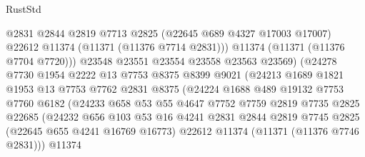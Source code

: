 \begin{lexlean}{RustStd}
\begin{coremodule}
                              @2831
                              @2844
                              @2819
                              @7713
                              @2825
                              (@22645 @689 @4327 @17003 @17007)
                              @22612
                              @11374
                              (@11371 (@11376 @7714 @2831)))
                            @11374
                            (@11371 (@11376 @7704 @7720)))
                          @23548
                          @23551
                          @23554
                          @23558
                          @23563
                          @23569)
                        (@24278
                          @7730
                          @1954
                          @2222
                          @13
                          @7753
                          @8375
                          @8399
                          @9021
                          (@24213
                            @1689
                            @1821
                            @1953
                            @13
                            @7753
                            @7762
                            @2831
                            @8375
                            (@24224
                              @1688
                              @489
                              @19132
                              @7753
                              @7760
                              @6182
                              (@24233
                                @658
                                @53
                                @55
                                @4647
                                @7752
                                @7759
                                @2819
                                @7735
                                @2825
                                @22685
                                (@24232
                                  @656
                                  @103
                                  @53
                                  @16
                                  @4241
                                  @2831
                                  @2844
                                  @2819
                                  @7745
                                  @2825
                                  (@22645 @655 @4241 @16769 @16773)
                                  @22612
                                  @11374
                                  (@11371 (@11376 @7746 @2831)))
                                @11374

\end{coremodule}
\end{lexlean}
